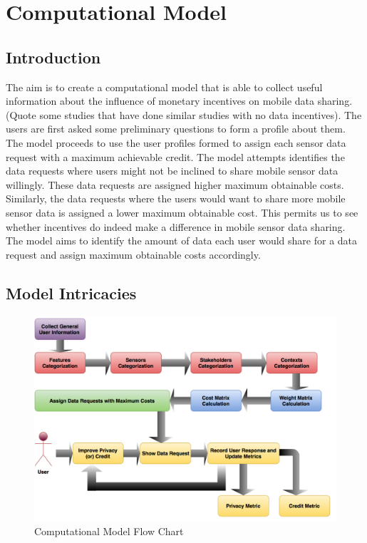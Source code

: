 \chapter{Computational Model} \label{model}

\newcommand{\numcategories}[0]{$cat$ }
\newcommand{\numsubcategories}[0]{$cat$ }
\newcommand{\numsensors}[0]{$N_S$ }
\newcommand{\numstakeholders}[0]{$N_{DC}$ }
\newcommand{\numcontexts}[0]{$N_C$ }
\newcommand{\numquestions}[0]{$N_{DR}$ } 
\newcommand{\numsubfeatures}[0]{$num_{sf}$ } 




\section{Introduction}
The aim is to create a computational model that is able to collect useful information about the influence of monetary incentives on mobile
data sharing. (Quote some studies that have done similar studies with no data incentives). 
The users are first asked some preliminary questions to form a profile about them. The model proceeds to use the user profiles 
formed to assign each sensor data request
with a maximum achievable credit. The model attempts identifies the data requests where users might not be inclined to share mobile sensor data willingly. These data requests are assigned higher maximum obtainable costs. Similarly, the data requests where the users would want to share more mobile sensor data
is assigned a lower maximum obtainable cost. This permits us to see whether incentives do indeed make a difference in mobile sensor
data sharing. The model aims to identify the amount of data each user would share for a data request and assign maximum obtainable costs accordingly.

\section{Model Intricacies}

\begin{figure}[ht!]
\centering
\includegraphics[width=\textwidth,keepaspectratio]{./images/model_building_blocks}
\caption{Computational Model Flow Chart \label{model_blocks}}
\end{figure}

